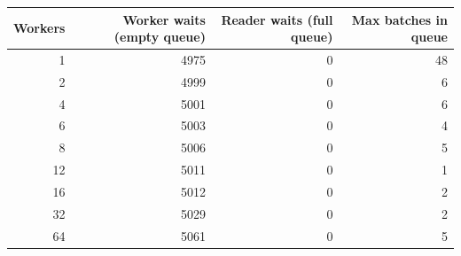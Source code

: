 \begin{tabular}{rrrr}
\toprule
Workers & Worker waits (empty queue) & Reader waits (full queue) & Max batches in queue \\
\midrule
1 & 4975 & 0 & 48 \\
2 & 4999 & 0 & 6 \\
4 & 5001 & 0 & 6 \\
6 & 5003 & 0 & 4 \\
8 & 5006 & 0 & 5 \\
12 & 5011 & 0 & 1 \\
16 & 5012 & 0 & 2 \\
32 & 5029 & 0 & 2 \\
64 & 5061 & 0 & 5 \\
\bottomrule
\end{tabular}
